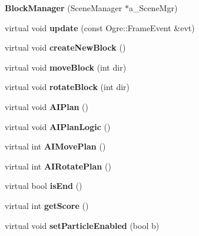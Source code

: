 \begin{DoxyCompactItemize}
\item 
\hypertarget{class_block_manager_a23667f9b62f96c6de25668a941fe7eec}{{\bfseries Block\-Manager} (Scene\-Manager $\ast$a\-\_\-\-Scene\-Mgr)}\label{class_block_manager_a23667f9b62f96c6de25668a941fe7eec}

\item 
\hypertarget{class_block_manager_afa3d60106faa33b29cffe60eabceb45f}{virtual void {\bfseries update} (const Ogre\-::\-Frame\-Event \&evt)}\label{class_block_manager_afa3d60106faa33b29cffe60eabceb45f}

\item 
\hypertarget{class_block_manager_af03f6328fb1c5ad2e408ae947d23c350}{virtual void {\bfseries create\-New\-Block} ()}\label{class_block_manager_af03f6328fb1c5ad2e408ae947d23c350}

\item 
\hypertarget{class_block_manager_a6c70dd950f9754a5ce4a76fb564d3beb}{virtual void {\bfseries move\-Block} (int dir)}\label{class_block_manager_a6c70dd950f9754a5ce4a76fb564d3beb}

\item 
\hypertarget{class_block_manager_a100818f16347fa6de20c7fb2c9f805a0}{virtual void {\bfseries rotate\-Block} (int dir)}\label{class_block_manager_a100818f16347fa6de20c7fb2c9f805a0}

\item 
\hypertarget{class_block_manager_a620fcc88b0a143316d84b7e77df6199e}{virtual void {\bfseries A\-I\-Plan} ()}\label{class_block_manager_a620fcc88b0a143316d84b7e77df6199e}

\item 
\hypertarget{class_block_manager_a3a90440297090de6409696c1ce1a129f}{virtual void {\bfseries A\-I\-Plan\-Logic} ()}\label{class_block_manager_a3a90440297090de6409696c1ce1a129f}

\item 
\hypertarget{class_block_manager_ab88a0f31d62055480f3798d7b2f09b6f}{virtual int {\bfseries A\-I\-Move\-Plan} ()}\label{class_block_manager_ab88a0f31d62055480f3798d7b2f09b6f}

\item 
\hypertarget{class_block_manager_aa5e7a0830d4105b4fdb7f59e58ca06b5}{virtual int {\bfseries A\-I\-Rotate\-Plan} ()}\label{class_block_manager_aa5e7a0830d4105b4fdb7f59e58ca06b5}

\item 
\hypertarget{class_block_manager_ad28546fe41da51c1e4ddfd14c8eeead8}{virtual bool {\bfseries is\-End} ()}\label{class_block_manager_ad28546fe41da51c1e4ddfd14c8eeead8}

\item 
\hypertarget{class_block_manager_ab9ed2c6d6c044417515a04beb836f7f7}{virtual int {\bfseries get\-Score} ()}\label{class_block_manager_ab9ed2c6d6c044417515a04beb836f7f7}

\item 
\hypertarget{class_block_manager_a0f52d717e79da943ff045d715cbde5fe}{virtual void {\bfseries set\-Particle\-Enabled} (bool b)}\label{class_block_manager_a0f52d717e79da943ff045d715cbde5fe}

\end{DoxyCompactItemize}
